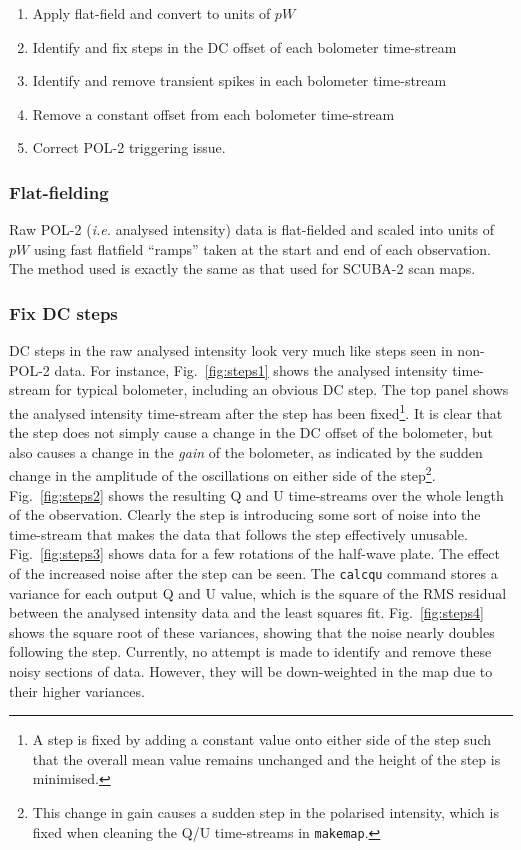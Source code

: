 \documentclass[twoside,11pt]{starlink}
\begin{document}
\begin{enumerate}
\item Apply flat-field and convert to units of $pW$
\item Identify and fix steps in the DC offset of each bolometer time-stream
\item Identify and remove transient spikes in each  bolometer time-stream
\item Remove a constant offset from each bolometer time-stream
\item Correct POL-2 triggering issue.
\end{enumerate}

\subsubsection{Flat-fielding}
Raw POL-2 (\emph{i.e.} analysed  intensity) data is flat-fielded and
scaled into units of $pW$ using fast flatfield ``ramps'' taken at the start
and end of each observation. The method used is exactly the same as that used
for SCUBA-2 scan maps.

\subsubsection{Fix DC steps}
\label{sec:steps}
DC steps in the raw analysed intensity look very much like steps seen in
non-POL-2 data. For instance, Fig.~\ref{fig:steps1} shows the analysed
intensity time-stream for typical bolometer, including an obvious DC
step. The top panel shows the analysed intensity time-stream after the
step has been fixed\footnote{A step is fixed by adding a constant value
onto either side of the step such that the overall mean value remains
unchanged and the height of the step is minimised.}. It is clear that the
step does not simply cause a change in the DC offset of the bolometer, but also
causes a change in the \emph{gain} of the bolometer, as indicated by the
sudden change in the amplitude of the oscillations on either side of the
step\footnote{This change in gain causes a sudden step in the polarised
intensity, which is fixed when cleaning the Q/U time-streams in
\texttt{makemap}.}. Fig.~\ref{fig:steps2} shows the resulting Q and U time-streams over
the whole length of the observation. Clearly the step is introducing some
sort of noise into the time-stream that makes the data that follows the
step effectively unusable. Fig.~\ref{fig:steps3} shows data for a few
rotations of the half-wave plate. The effect of the increased noise after
the step can be seen. The \texttt{calcqu} command stores a variance
for each output Q and U value, which is the square of the RMS residual
between the analysed intensity data and the least squares fit.
Fig.~\ref{fig:steps4} shows the square root of these variances,
showing that the noise nearly doubles following the step. Currently, no
attempt is made to identify and remove these noisy sections of data.
However, they will be down-weighted in the map due to their higher
variances.
\end{document}
